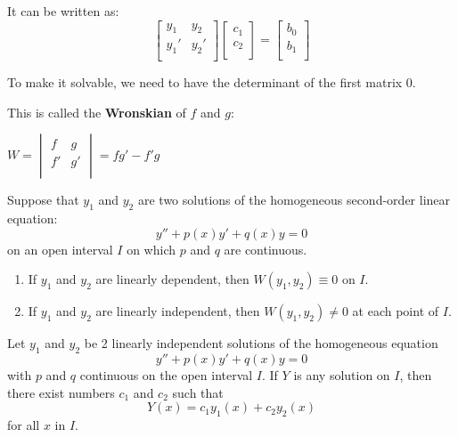It can be written as:
\[
    \begin{bmatrix}
       y_1 & y_2 \\
       y_1' & y_2'  \\
    \end{bmatrix}
    \begin{bmatrix}
         c_1 \\
         c_2 \\
    \end{bmatrix}
    =
    \begin{bmatrix}
         b_0 \\
         b_1 \\
    \end{bmatrix}
\]

To make it solvable, we need to have the determinant of the first matrix 0. 

This is called the \textbf{Wronskian} of \(f\) and \(g\):
\begin{definition}[Wronskian]
    \(W = \begin{vmatrix}
        f &  g \\
        f' & g'  \\
    \end{vmatrix}
    = fg' - f'g
    \) 
\end{definition}  

\begin{theorem}
    Suppose that \(y_1\) and \(y_2\) are two solutions of the homogeneous second-order linear equation:
    \[
        y'' + p(x)y' + q(x)y = 0
    \]  
    on an open interval \(I\) on which \(p\) and \(q\) are continuous.   
    \begin{enumerate}
        \item If \(y_1\) and \(y_2\) are linearly dependent, then \(W(y_1, y_2) \equiv 0\) on \(I\).    
        \item If \(y_1\) and \(y_2\) are linearly independent, then \(W(y_1, y_2) \neq 0\) at each point of \(I\).    
    \end{enumerate}
\end{theorem}

\begin{theorem}
    Let \(y_1\) and \(y_2\) be 2 linearly independent solutions of the homogeneous equation
    \[
        y'' + p(x) y' + q(x) y = 0
    \]  
    with \(p\) and \(q\) continuous on the open interval \(I\).   
    If \(Y\) is any solution on \(I\), then there exist numbers \(c_1\) and \(c_2\) such that
    \[
        Y(x) = c_1y_1(x) + c_2y_2(x)
    \]    
    for all \(x\) in \(I\).  
\end{theorem}

